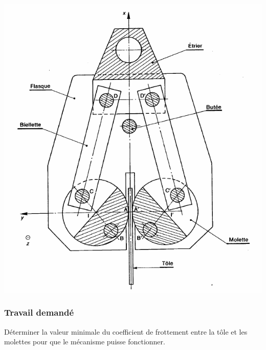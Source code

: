 \begin{center}
\includegraphics[scale=0.5]{png/molettes.png}
\end{center}

\subsubsection{Travail demandé}
Déterminer la valeur minimale du coefficient de frottement entre la tôle et les molettes pour que le mécanisme puisse fonctionner.


\newpage


